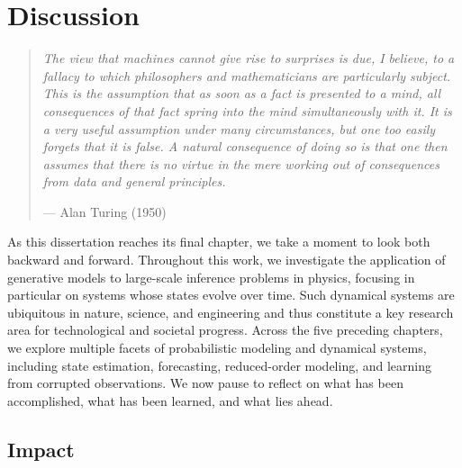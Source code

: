 \chapter{Discussion} \label{chap:discussion}

\begin{quote}
    \textit{The view that machines cannot give rise to surprises is due, I believe, to a fallacy to which philosophers and mathematicians are particularly subject. This is the assumption that as soon as a fact is presented to a mind, all consequences of that fact spring into the mind simultaneously with it. It is a very useful assumption under many circumstances, but one too easily forgets that it is false. A natural consequence of doing so is that one then assumes that there is no virtue in the mere working out of consequences from data and general principles.}

    \begin{flushright}
        --- Alan Turing (1950) \nocite{turing1950computing}
    \end{flushright}
\end{quote}

\vspace{1em}

As this dissertation reaches its final chapter, we take a moment to look both backward and forward. Throughout this work, we investigate the application of generative models to large-scale inference problems in physics, focusing in particular on systems whose states evolve over time. Such dynamical systems are ubiquitous in nature, science, and engineering and thus constitute a key research area for technological and societal progress. Across the five preceding chapters, we explore multiple facets of probabilistic modeling and dynamical systems, including state estimation, forecasting, reduced-order modeling, and learning from corrupted observations. We now pause to reflect on what has been accomplished, what has been learned, and what lies ahead.

\vspace{-1ex}
\section{Impact}

